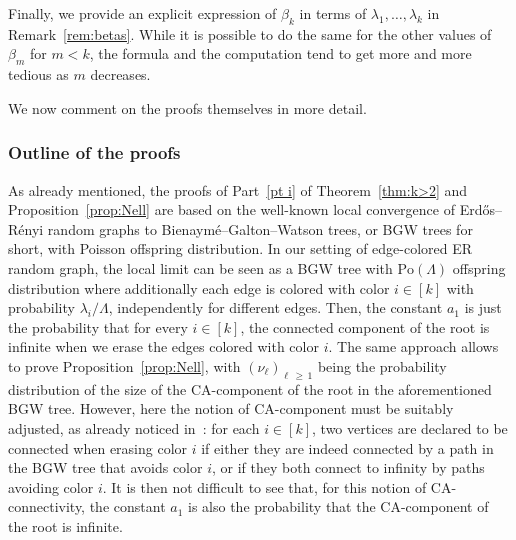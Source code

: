 \documentclass[AHL,Unicode,longabstracts,published]{cedram}
\begin{document}
Finally, we provide an explicit expression of $\beta_k$ in terms of $\lambda_1,\ldots,\lambda_k$ in Remark~\ref{rem:betas}. While it is possible to do the same for the other values of $\beta_m$ for $m<k$, the formula and the computation tend to get more and more tedious as $m$ decreases.


We now comment on the proofs themselves in more detail.


\subsubsection*{Outline of the proofs}
As already mentioned, the proofs of Part~\eqref{pt i} of Theorem~\ref{thm:k>2} and Proposition~\ref{prop:Nell} are based on the well-known local convergence of Erd\H{o}s--Rényi random graphs to Bienaymé--Galton--Watson trees, or BGW trees for short, with Poisson offspring distribution. In our setting of edge-colored ER random graph, the local limit can be seen as a BGW tree with $\text{Po}(\Lambda)$ offspring distribution where additionally each edge is colored with color $i\in [k]$ with probability $\lambda_i/\Lambda$, independently for different edges. Then, the constant $a_1$ is just the probability that for every $i\in [k]$, the connected component of the root is infinite when we erase the edges colored with color $i$. The same approach allows to prove Proposition~\ref{prop:Nell}, with $(\nu_\ell)_{\ell\,\ge\,1}$ being the probability distribution of the size of the CA-component of the root in the aforementioned BGW tree. However, here the notion of CA-component must be suitably adjusted, as already noticed in~\cite{RVFM22.0}: for each $i\in [k]$, two vertices are declared to be connected when erasing color $i$ if either they are indeed connected by a path in the BGW tree that avoids color $i$, or if they both connect to infinity by paths avoiding color $i$. It is then not difficult to see that, for this notion of CA-connectivity, the constant $a_1$ is also the probability that the CA-component of the root is infinite.
\end{document}
